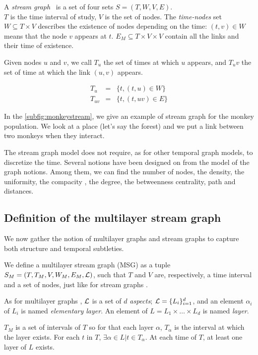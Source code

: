 \documentclass{svproc}
\begin{document}
A {\em stream graph}~\cite{stream} is a set of four sets $S=(T,W,V,E)$.\\
$T$ is the time interval of study, $V$ is the set of nodes. The {\em time-nodes} set $W \subseteq T \times V$ describes the existence of nodes depending on the time: $(t,v) \in W$ means that the node $v$ appears at $t$. $E_M \subseteq T \times V \times V$ contain all the links and their time of existence.

Given nodes $u$ and $v$, we call $T_u$ the set of times at which $u$ appears, and $T_uv$ the set of time at which the link $(u,v)$ appears.

\begin{equation}
\begin{array}{rcl}
T_u&=&\{t, (t,u) \in W \}\\
T_{uv}&=&\{t, (t,uv)\in E \}
\end{array}
\end{equation}

In the \cref{subfig:monkeystream}, we give an example of stream graph for the monkey population. We look at a place (let's say the forest) and we put a link between two monkeys when they interact.

The stream graph model does not require, as for other temporal graph models, to discretize the time. Several notions have been designed on \cite{stream} from the model of the graph notions. Among them, we can find the number of nodes, the density, the uniformity, the compacity , the degree, the betweenness centrality, path and distances.

\subsection{Definition of the multilayer stream graph}
%
We now gather the notion of multilayer graphs and stream graphs to capture both structure and temporal subtleties.

We define a multilayer stream graph (MSG) as a tuple $S_M = (T,T_M,V,W_M,E_M,{\cal L})$, such that $T$ and $V$ are, respectively, a time interval and a set of nodes, just like for stream graphs \cite{stream}.

    As for multilayer graphs \cite{mlkiv}, ${\cal L}$ is a set of $d$ {\em aspects}; ${\cal L} = \{L_i\}_{i=1}^d$, and an element $\alpha_i$ of $L_i$ is named {\em elementary layer}. An element of $L=L_1\times \dots \times L_d$ is named {\em layer}.

	$T_M$ is a set of intervals of $T$ so for that each layer $\alpha$, $T_{\alpha}$ is the interval at which the layer exists. For each $t$ in $T$, $\exists \alpha \in L | t \in T_{\alpha}$. At each time of $T$, at least one layer of $L$ exists.
\end{document}
